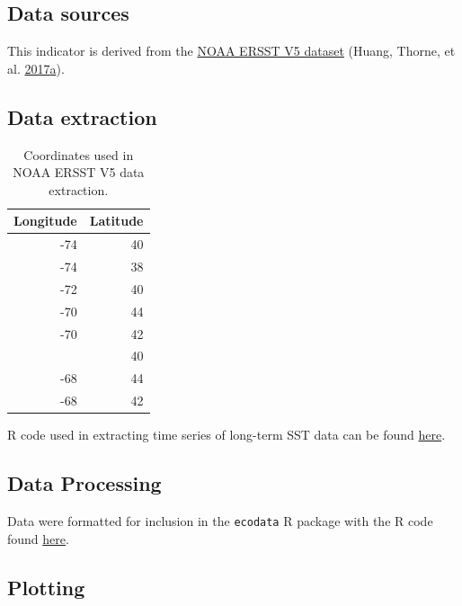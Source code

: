 \documentclass[
]{book}
\begin{document}
\hypertarget{data-sources-22}{%
\subsection{Data sources}\label{data-sources-22}}

This indicator is derived from the \href{https://www.esrl.noaa.gov/psd/data/gridded/data.noaa.ersst.v5.html}{NOAA ERSST V5 dataset} (Huang, Thorne, et al. \protect\hyperlink{ref-Huang2017}{2017}\protect\hyperlink{ref-Huang2017}{a}).

\hypertarget{data-extraction-19}{%
\subsection{Data extraction}\label{data-extraction-19}}

\begin{table}

\caption{\label{tab:coordinates}Coordinates used in NOAA ERSST V5 data extraction.}
\centering
\begin{tabular}[t]{rr}
\toprule
Longitude & Latitude\\
\midrule
-74 & 40\\
-74 & 38\\
-72 & 40\\
-70 & 44\\
-70 & 42\\
\addlinespace
-70 & 40\\
-68 & 44\\
-68 & 42\\
\bottomrule
\end{tabular}
\end{table}

R code used in extracting time series of long-term SST data can be found \href{https://github.com/NOAA-EDAB/tech-doc/tree/master/R/stored_scripts/long-term-sst-extraction.R}{here}.

\hypertarget{data-processing-16}{%
\subsection{Data Processing}\label{data-processing-16}}

Data were formatted for inclusion in the \texttt{ecodata} R package with the R code found \href{https://github.com/NOAA-EDAB/ecodata/blob/master/data-raw/get_long_term_sst.R}{here}.

\hypertarget{plotting-15}{%
\subsection{Plotting}\label{plotting-15}}
\end{document}

